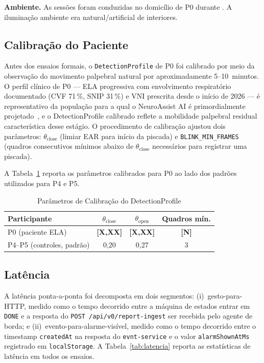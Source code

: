 \textbf{Ambiente.} As sessões foram conduzidas no domicílio de P0 durante
. A iluminação ambiente era natural/artificial de interiores.

\subsection{Calibração do Paciente}
\label{sec:calibracao}

Antes dos ensaios formais, o \texttt{DetectionProfile} de P0 foi calibrado por meio
da observação do movimento palpebral natural por aproximadamente 5--10~minutos. O
perfil clínico de P0 — ELA progressiva com envolvimento respiratório documentado
(CVF 71\,\%, SNIP 31\,\%) e VNI prescrita desde o início de 2026 — é representativo
da população para a qual o NeuroAssist AI é primordialmente
projetado~\cite{berlowitz2021niv, yang2026pva}, e o DetectionProfile calibrado reflete
a mobilidade palpebral residual característica desse estágio. O procedimento de
calibração ajustou dois parâmetros: $\theta_\text{close}$ (limiar EAR para início da
piscada) e \texttt{BLINK\_MIN\_FRAMES} (quadros consecutivos mínimos abaixo de
$\theta_\text{close}$ necessários para registrar uma piscada).

A Tabela~\ref{tab:calibracao} reporta os parâmetros calibrados para P0 ao lado dos
padrões utilizados para P4 e P5.

\begin{table}[htbp]
  \renewcommand{\arraystretch}{1.15}
  \caption{Parâmetros de Calibração do DetectionProfile}
  \label{tab:calibracao}
  \centering
  \begin{tabular}{lccc}
    \toprule
    Participante & $\theta_\text{close}$ & $\theta_\text{open}$ & Quadros mín. \\
    \midrule
    P0 (paciente ELA) & \textbf{[X,XX]} & \textbf{[X,XX]} & \textbf{[N]} \\
    P4--P5 (controles, padrão) & 0,20 & 0,27 & 3 \\
    \bottomrule
  \end{tabular}
\end{table}

\subsection{Latência}
\label{sec:latencia}

A latência ponta-a-ponta foi decomposta em dois segmentos: (i)~gesto-para-HTTP,
medido como o tempo decorrido entre a máquina de estados entrar em \texttt{DONE} e a
resposta do \texttt{POST /api/v0/report-ingest} ser recebida pelo agente de borda; e
(ii)~evento-para-alarme-visível, medido como o tempo decorrido entre o timestamp
\texttt{createdAt} na resposta do \texttt{evnt-service} e o valor
\texttt{alarmShownAtMs} registrado em \texttt{localStorage}. A Tabela~\ref{tab:latencia}
reporta as estatísticas de latência em todos os ensaios.

